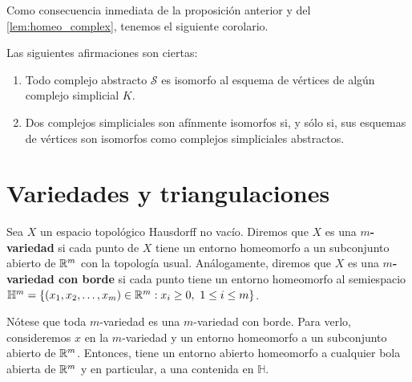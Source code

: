 Como consecuencia inmediata de la proposición anterior y del \autoref{lem:homeo_complex},
tenemos el siguiente corolario.

\begin{corolario}
	Las siguientes afirmaciones son ciertas:
	\begin{enumerate}[label=(\alph{*})]
		\item Todo complejo abstracto \(\mathcal{S}\) es isomorfo al esquema de vértices
			de algún complejo simplicial \(K\).
		\item Dos complejos simpliciales son afínmente isomorfos si, y sólo si, sus esquemas
			de vértices son isomorfos como complejos simpliciales abstractos.
	\end{enumerate}
\end{corolario}

\section{Variedades y triangulaciones}

\begin{definicion}
	Sea \(X\) un espacio topológico Hausdorff no vacío. Diremos que \(X\) es una \textbf{\(m\)-variedad} 
	si cada punto de \(X\) tiene un entorno homeomorfo a un subconjunto abierto de \(\mathbb{R}^m\) con la 
	topología usual. Análogamente, diremos que \(X\) es una \textbf{\(m\)-variedad con borde} si 
	cada punto tiene un entorno homeomorfo al semiespacio 
	\(\mathbb{H}^m = \{ (x_1, x_2, \ldots,x_m) \in \mathbb{R}^m : x_i \geq 0,\ 1 \leq i \leq m \}\).
\end{definicion}
\begin{observacion}
	Nótese que toda \(m\)-variedad es una \(m\)-variedad con borde. Para verlo, consideremos \(x\) 
	en la \(m\)-variedad y un entorno homeomorfo a un subconjunto abierto de \(\mathbb{R}^m\). Entonces, 
	tiene un entorno abierto homeomorfo a cualquier bola abierta de \(\mathbb{R}^m\) y en particular, 
	a una contenida en \(\mathbb{H}\).
\end{observacion}

\endinput
